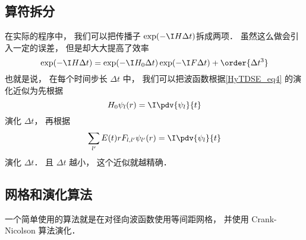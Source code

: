 \subsection{算符拆分}
在实际的程序中， 我们可以把传播子 $\exp(-\I H \Delta t)$拆成两项． 虽然这么做会引入一定的误差， 但是却大大提高了效率
\begin{equation}
\exp(-\I H \Delta t) = \exp(-\I H_0 \Delta t)\exp(-\I F \Delta t) + \order{\Delta t^3}
\end{equation}
也就是说， 在每个时间步长 $\Delta t$ 中， 我们可以把波函数根据\autoref{HyTDSE_eq4} 的演化近似为先根据
\begin{equation}
H_0 \psi_{l}(r) = \I \pdv{\psi_{l}}{t}
\end{equation}
演化 $\Delta t$， 再根据
\begin{equation}
\sum_{l'} E(t)rF_{l, l'} \psi_{l'}(r) = \I \pdv{\psi_{l}}{t}
\end{equation}
演化 $\Delta t$． 且 $\Delta t$ 越小， 这个近似就越精确．

\subsection{网格和演化算法}
一个简单使用的算法就是在对径向波函数使用等间距网格， 并使用 Crank-Nicolson 算法演化．
